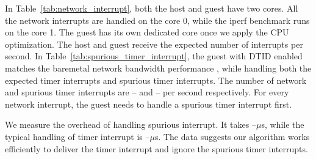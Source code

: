 In Table~\ref{tab:network_interrupt}, both the host and guest
have two cores. All the network interrupts are handled on the
core 0, while the iperf benchmark runs on the core 1. The
guest has its own dedicated core once we apply the CPU
optimization. The host and guest receive the expected number
of interrupts per second. In
Table~\ref{tab:spurious_timer_interrupt}, the guest with DTID
enabled matches the baremetal network bandwidth performance ,
while handling both the expected timer interrupts and spurious
timer interrupts. The number of network and spurious timer
interrupts are -- and -- per second respectively. For every
network interrupt, the guest needs to handle a spurious timer
interrupt first.

We measure the overhead of handling spurious interrupt. It
takes --$\mu$s, while the typical handling of timer interrupt
is --$\mu$s. The data suggests our algorithm works efficiently
to deliver the timer interrupt and ignore the spurious timer
interrupts.
